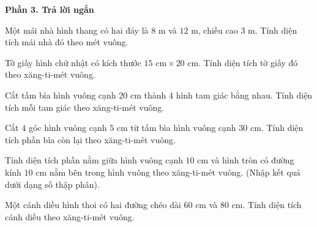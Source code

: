 \textbf{Phần 3. Trả lời ngắn}

\begin{ex} %
Một mái nhà hình thang có hai đáy là $8\text{ m}$ và $12\text{ m}$, chiều cao $3\text{ m}$. Tính diện tích mái nhà đó theo mét vuông.
\end{ex}

\begin{ex} %
Tờ giấy hình chữ nhật có kích thước $15\text{ cm} \times 20\text{ cm}$. Tính diện tích tờ giấy đó theo xăng-ti-mét vuông.
\end{ex}

\begin{ex} %
Cắt tấm bìa hình vuông cạnh $20\text{ cm}$ thành $4$ hình tam giác bằng nhau. Tính diện tích mỗi tam giác theo xăng-ti-mét vuông.
\end{ex}

\begin{ex} %
Cắt $4$ góc hình vuông cạnh $5\text{ cm}$ từ tấm bìa hình vuông cạnh $30\text{ cm}$. Tính diện tích phần bìa còn lại theo xăng-ti-mét vuông.
\end{ex}

\begin{ex} %
Tính diện tích phần nằm giữa hình vuông cạnh $10\text{ cm}$ và hình tròn có đường kính $10\text{ cm}$ nằm bên trong hình vuông theo xăng-ti-mét vuông. (Nhập kết quả dưới dạng số thập phân).
\end{ex}

\begin{ex} %
Một cánh diều hình thoi có hai đường chéo dài $60\text{ cm}$ và $80\text{ cm}$. Tính diện tích cánh diều theo xăng-ti-mét vuông.
\end{ex}
